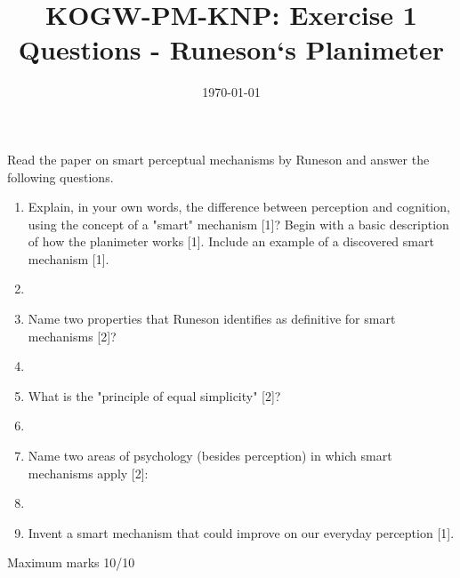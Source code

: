 \documentclass[12pt,english]{scrartcl}
\title{KOGW-PM-KNP:  Exercise 1 Questions - Runeson`s Planimeter}
\author{}
\date{\today}
\begin{document}
\maketitle

\raggedright
Read the paper on smart perceptual mechanisms by Runeson and answer the following questions. \\


\begin{enumerate}
 \item Explain, in your own words, the difference between perception and cognition, using the concept of a "smart" mechanism [1]? Begin with a basic description of how the planimeter works [1]. Include an example of a discovered smart mechanism [1].
 \item[]
 \item Name two properties that Runeson identifies as definitive for smart mechanisms [2]?
 \item[]
 \item What is the "principle of equal simplicity" [2]?
 \item[]
 \item Name two areas of psychology (besides perception) in which smart mechanisms apply [2]:
 \item[]
 \item Invent a smart mechanism that could improve on our everyday perception [1].
\end{enumerate}

Maximum marks 10/10
\end{document}
